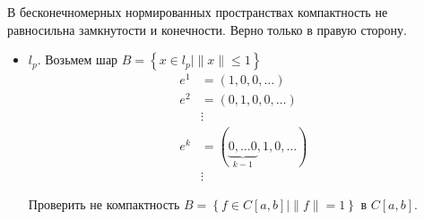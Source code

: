 \begin{note}
    В бесконечномерных нормированных пространствах компактность не равносильна замкнутости и конечности. Верно только в правую сторону.
    \begin{itemize}
	\item $ l_p$. Возьмем шар $ B = \left\{ x \in  l_p \mid \| x \| \le 1 \right\} $
	    \begin{align*}
		e^{1} & = (1, 0, 0, \ldots )\\
		e^2 & = (0, 1, 0, 0, \ldots ) \\
		    &\vdots \\
		e^{k} &= (\underbrace{0, \ldots 0}_{k-1}, 1, 0, \ldots ) \\
		      & \vdots
	    \end{align*}
	    \begin{prac}
		Проверить не компактность
		$ B = \left\{ f \in C[a, b] \mid \|f\| = 1 \right\} $ в $ C[a, b]$.
	    \end{prac}
    \end{itemize}
\end{note}
